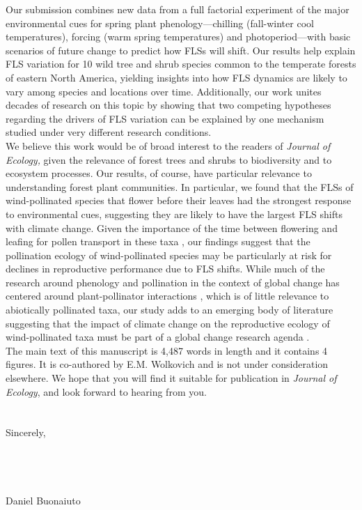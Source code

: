 \documentclass[11.75 pt]{article}\usepackage[]{graphicx}\usepackage[]{color}
\begin{document}
\noindent Our submission combines new data from a full factorial experiment of the major environmental cues for spring plant phenology---chilling (fall-winter cool temperatures), forcing (warm spring temperatures) and photoperiod---with basic scenarios of future change to predict how FLSs will shift. Our results help explain FLS variation for 10 wild tree and shrub species common to the temperate forests of eastern North America, yielding insights into how FLS dynamics are likely to vary among species and locations over time. Additionally, our work unites decades of research on this topic by showing that two competing hypotheses regarding the drivers of FLS variation can be explained by one mechanism studied under very different research conditions. \\

\noindent We believe this work would be of broad interest to the readers of \textit{Journal of Ecology,} given the relevance of forest trees and shrubs to biodiversity and to ecosystem processes. Our results, of course, have particular relevance to understanding forest plant communities. In particular, we found that the FLSs of wind-pollinated species that flower before their leaves had the strongest response to environmental cues, suggesting they are likely to have the largest FLS shifts with climate change. Given the importance of the time between flowering and leafing for pollen transport in these taxa \citep{Rathcke_1985}, our findings suggest that the pollination ecology of wind-pollinated species may be particularly at risk for declines in reproductive performance due to FLS shifts. While much of the research around phenology and pollination in the context of global change has centered around plant-pollinator interactions \citep{Settele:2016aa}, which is of little relevance to abiotically pollinated taxa, our study adds to an emerging body of literature suggesting that the impact of climate change on the reproductive ecology of wind-pollinated taxa must be part of a global change research agenda \citep{Kling:2020aa}.\\

\noindent The main text of this manuscript is 4,487 words in length and it contains 4 figures. It is co-authored by E.M. Wolkovich and is not under consideration elsewhere. We hope that you will find it suitable for publication in \textit{Journal of Ecology}, and look forward to hearing from you.\\\\ 
\\Sincerely,\\\\\\\\\\

\noindent Daniel Buonaiuto\\


 
\end{document}
